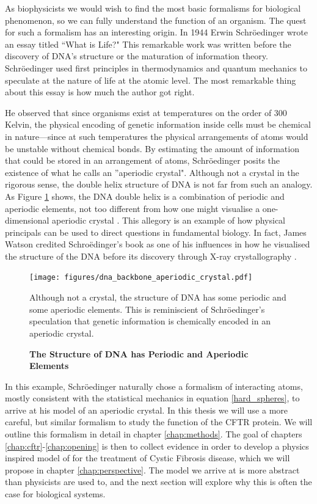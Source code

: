 As biophysicists we would wish to find the most basic formalisms for biological phenomenon, so we can fully understand the function of an organism. The quest for such a formalism has an interesting origin. In 1944 Erwin Schr\"oedinger wrote an essay titled ``What is Life?" This remarkable work was written before the discovery of DNA's structure or the maturation of information theory. Schr\"oedinger used first principles in thermodynamics and quantum mechanics to speculate at the nature of life at the atomic level. The most remarkable thing about this essay is how much the author got right. 

He observed that since organisms exist at temperatures on the order of 300 Kelvin, the physical encoding of genetic information inside cells must be chemical in nature---since at such temperatures the physical arrangements of atoms would be unstable without chemical bonds. By estimating the amount of information that could be stored in an arrangement of atoms, Schr\"oedinger posits the existence of what he calls an ''aperiodic crystal". Although not a crystal in the rigorous sense, the double helix structure of DNA is not far from such an analogy. As Figure \ref{dna_structure} shows, the DNA double helix is a combination of periodic and aperiodic elements, not too different from how one might visualise a one-dimensional aperiodic crystal \cite{varn2016}. This allegory is an example of how physical principals can be used to direct questions in fundamental biology. In fact, James Watson credited Schro\"edinger's book as one of his influences in how he visualised the structure of the DNA before its discovery through X-ray crystallography \cite{watson2010}.

\begin{figure}
	\begin{center}
		\texttt{[image: figures/dna\_backbone\_aperiodic\_crystal.pdf]}
	\end{center}
	\captionsetup{singlelinecheck = false, justification=raggedright}
	\caption[The Structure of DNA has Periodic and Aperiodic Elements] {\textbf{The Structure of DNA has Periodic and Aperiodic Elements}}{Although not a crystal, the structure of DNA has some periodic and some aperiodic elements. This is reminiscient of Schr\"oedinger's speculation that genetic information is chemically encoded in an aperiodic crystal. }
	\label{dna_structure}
\end{figure}

In this example, Schr\"oedinger naturally chose a formalism of interacting atoms, mostly consistent with the statistical mechanics in equation \ref{hard_spheres}, to arrive at his model of an aperiodic crystal. In this thesis we will use a more careful, but similar formalism to study the function of the CFTR protein. We will outline this formalism in detail in chapter \ref{chap:methods}. The goal of chapters \ref{chap:cftr}-\ref{chap:opening} is then to collect evidence in order to develop a physics inspired model of for the treatment of Cystic Fibrosis disease, which we will propose in chapter \ref{chap:perspective}. The model we arrive at is more abstract than physicists are used to, and the next section will explore why this is often the case for biological systems.
 
